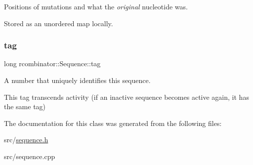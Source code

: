 Positions of mutations and what the {\itshape original} nucleotide was. 

Stored as an unordered map locally. \mbox{\label{classrcombinator_1_1Sequence_a9f9a2f4654d8b0e0cdb3061b9e0775d7}} 
\subsubsection{\texorpdfstring{tag}{tag}}
{\footnotesize\ttfamily long rcombinator\+::\+Sequence\+::tag\hspace{0.3cm}{\ttfamily [private]}}



A number that uniquely identifies this sequence. 

This tag transcends activity (if an inactive sequence becomes active again, it has the same tag) 

The documentation for this class was generated from the following files\+:\begin{DoxyCompactItemize}
\item 
src/\mbox{\hyperlink{sequence_8h}{sequence.\+h}}\item 
src/sequence.\+cpp\end{DoxyCompactItemize}
